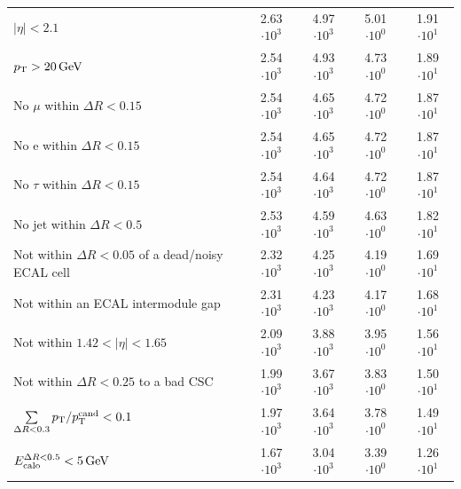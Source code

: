 \begin{table}[!h]
{\begin{tabular}{|l|c|c|c|c|}
$|\eta|<2.1$                                                                              & 2.63 $\cdot10^{3 }$ & 4.97 $\cdot10^{3 }$ & 5.01 $\cdot10^{0 }$ & 1.91 $\cdot10^{1 }$ \\
$p_{\text{T}}>20\,\text{Ge}\kern-0.06667em\text{V}$                                                                              & 2.54 $\cdot10^{3 }$ & 4.93 $\cdot10^{3 }$ & 4.73 $\cdot10^{0 }$ & 1.89 $\cdot10^{1 }$ \\
No $\mu$ within $\Delta R<0.15$                                                           & 2.54 $\cdot10^{3 }$ & 4.65 $\cdot10^{3 }$ & 4.72 $\cdot10^{0 }$ & 1.87 $\cdot10^{1 }$ \\
No e within $\Delta R<0.15$                                                               & 2.54 $\cdot10^{3 }$ & 4.65 $\cdot10^{3 }$ & 4.72 $\cdot10^{0 }$ & 1.87 $\cdot10^{1 }$ \\
No $\tau$ within $\Delta R<0.15$                                                          & 2.54 $\cdot10^{3 }$ & 4.64 $\cdot10^{3 }$ & 4.72 $\cdot10^{0 }$ & 1.87 $\cdot10^{1 }$ \\
No jet within $\Delta R<0.5$                                                              & 2.53 $\cdot10^{3 }$ & 4.59 $\cdot10^{3 }$ & 4.63 $\cdot10^{0 }$ & 1.82 $\cdot10^{1 }$ \\
\makecell[l]{Not within $\Delta R<0.05$ of \\\hfill a dead/noisy ECAL cell}               & 2.32 $\cdot10^{3 }$ & 4.25 $\cdot10^{3 }$ & 4.19 $\cdot10^{0 }$ & 1.69 $\cdot10^{1 }$ \\
Not within an ECAL  intermodule gap                                                       & 2.31 $\cdot10^{3 }$ & 4.23 $\cdot10^{3 }$ & 4.17 $\cdot10^{0 }$ & 1.68 $\cdot10^{1 }$ \\
Not within $1.42<|\eta|<1.65$                                                             & 2.09 $\cdot10^{3 }$ & 3.88 $\cdot10^{3 }$ & 3.95 $\cdot10^{0 }$ & 1.56 $\cdot10^{1 }$ \\
Not within $\Delta R<0.25$ to a bad CSC                                                   & 1.99 $\cdot10^{3 }$ & 3.67 $\cdot10^{3 }$ & 3.83 $\cdot10^{0 }$ & 1.50 $\cdot10^{1 }$ \\
$\sum \limits_{\Delta R < 0.3} p_{\text{T}}/p_{\text{T}}^{\text{cand}} < 0.1$                      & 1.97 $\cdot10^{3 }$ & 3.64 $\cdot10^{3 }$ & 3.78 $\cdot10^{0 }$ & 1.49 $\cdot10^{1 }$ \\
$E^{\Delta R<0.5}_{\text{calo}}<5\,\text{Ge}\kern-0.06667em\text{V}$                                                                            & 1.67 $\cdot10^{3 }$ & 3.04 $\cdot10^{3 }$ & 3.39 $\cdot10^{0 }$ & 1.26 $\cdot10^{1 }$ \\
\bottomrule
\end{tabular}}
\end{table}  

